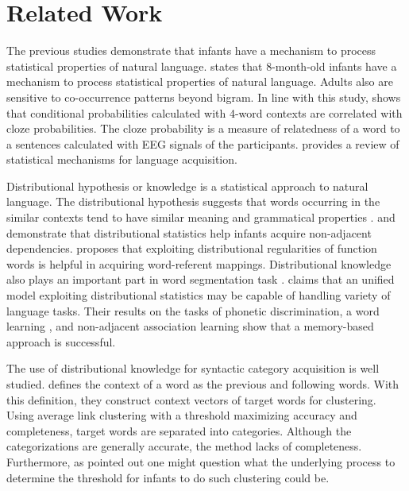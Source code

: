 \section{Related Work}

The previous studies demonstrate that infants have a mechanism to process
statistical properties of natural language. \cite{saffran1996statistical} 
states that 8-month-old infants have a mechanism to process
statistical properties of natural language. Adults also
are sensitive to co-occurrence patterns beyond bigram. In line
with this study, \cite{hahn2012measuring} shows that conditional probabilities
calculated with 4-word contexts are correlated with cloze probabilities.
The cloze probability is a measure of relatedness of a word to a sentences calculated
with EEG signals of the participants. \cite{arnon2010more}
\cite{romberg2010statistical} provides a review of statistical mechanisms
for language acquisition.

Distributional hypothesis or knowledge is a statistical approach to natural
language. The distributional hypothesis suggests that words 
occurring in the similar contexts tend to have similar meaning 
and grammatical properties \cite{harris1954word}. 
\cite{gomez2002variability} and \cite{van2010linking} demonstrate
that distributional statistics help infants acquire non-adjacent
dependencies. \cite{monaghan2012integratingDistributional} proposes that
exploiting distributional regularities of function words is helpful in acquiring word-referent
mappings. Distributional knowledge also plays an 
important part in word segmentation task \cite{saffran1996word}.
\cite{thiessen2012iminerva} claims that an unified model exploiting distributional
statistics may be capable of handling variety of language tasks. Their results on
the tasks of phonetic discrimination, a word learning , and non-adjacent
association learning show that a memory-based approach is successful.

The use of distributional knowledge for syntactic category acquisition
is well studied. \cite{Redington98distributionalinformation} defines the context of
a word as the previous and following words. With this definition, they construct
context vectors of target words for clustering. Using average link clustering
with a threshold maximizing accuracy and completeness, target  words are
separated into categories. Although the categorizations are generally accurate,
the method lacks of completeness. Furthermore, as \cite{ambridge2011child} pointed
out one might question what the underlying process to determine the
threshold for infants to do such clustering could be.


